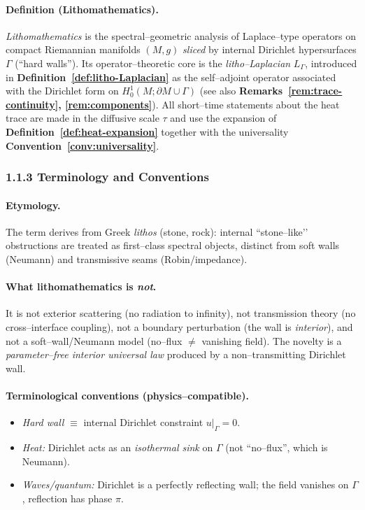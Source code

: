 \paragraph{Definition (Lithomathematics).}
\emph{Lithomathematics} is the spectral–geometric analysis of Laplace–type operators on compact Riemannian manifolds $(M,g)$ \emph{sliced} by internal Dirichlet hypersurfaces $\Gamma$ (``hard walls'').
Its operator–theoretic core is the \emph{litho–Laplacian} $L_\Gamma$, introduced in \textbf{Definition~\ref{def:litho-Laplacian}} as the self–adjoint operator associated with the Dirichlet form on $H^1_0(M;\partial M\cup\Gamma)$ (see also \textbf{Remarks~\ref{rem:trace-continuity}, \ref{rem:components}}).
All short–time statements about the heat trace are made in the diffusive scale $\tau$ and use the expansion of \textbf{Definition~\ref{def:heat-expansion}} together with the universality \textbf{Convention~\ref{conv:universality}}.

\subsubsection*{1.1.3 Terminology and Conventions}
\paragraph{Etymology.}
The term derives from Greek \emph{lithos} (stone, rock): internal “stone–like’’ obstructions are treated as first–class spectral objects, distinct from soft walls (Neumann) and transmissive seams (Robin/impedance).

\paragraph{What lithomathematics is \emph{not}.}
It is not exterior scattering (no radiation to infinity), not transmission theory (no cross–interface coupling), not a boundary perturbation (the wall is \emph{interior}), and not a soft–wall/Neumann model (no–flux $\neq$ vanishing field).
The novelty is a \emph{parameter–free interior universal law} produced by a non–transmitting Dirichlet wall.

\paragraph{Terminological conventions (physics–compatible).}
\begin{itemize}
  \item \emph{Hard wall} $\equiv$ internal Dirichlet constraint $u|_\Gamma=0$.
  \item \emph{Heat:} Dirichlet acts as an \emph{isothermal sink} on $\Gamma$ (not “no–flux”, which is Neumann).
  \item \emph{Waves/quantum:} Dirichlet is a perfectly reflecting wall; the field vanishes on $\Gamma$, reflection has phase $\pi$.
\end{itemize}

